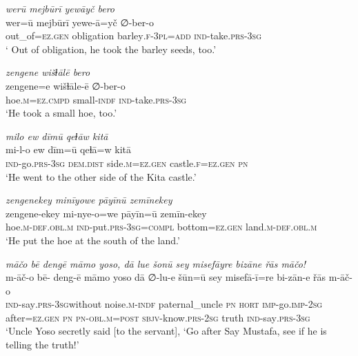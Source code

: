 \ea \label{ŽP.29}
\textit{werū mejbūrī yewāyč bero} \\ 
\gll wer=ū mejbūrī yewe-ā=yč ∅-ber-o \\ 
 out\_of\textsc{\textsc{=ez.gen}} obligation barley\textsc{.f}\textsc{-3pl}\textsc{=add} \textsc{ind-}take\textsc{.prs}\textsc{-3sg} \\ 
\glt ` Out of obligation, he took the barley seeds, too.'
\z 
 
\ea \label{ŽP.30}
\textit{zengene wišɫālē bero} \\ 
\gll zengene=e wišɫāle-ē ∅-ber-o \\ 
 hoe\textsc{.m}\textsc{=ez}\textsc{.cmpd} small\textsc{-indf} \textsc{ind-}take\textsc{.prs}\textsc{-3sg} \\ 
\glt `He took a small hoe, too.'
\z 
 
\ea \label{ŽP.31}
\textit{milo ew dīmū qeɫāw kitā} \\ 
\gll mi-l-o ew dīm=ū qeɫā=w kitā \\ 
 \textsc{ind-}go\textsc{.prs}\textsc{-3sg} \textsc{dem.dist} side\textsc{.m}\textsc{\textsc{=ez.gen}} castle\textsc{.f}\textsc{\textsc{=ez.gen}} \textsc{pn} \\ 
\glt `He went to the other side of the Kita castle.'
\z 
 
\ea \label{ŽP.34}
\textit{zengenekey minīyowe pāyīnū zemīnekey} \\ 
\gll zengene-ekey mi-nye-o=we pāyīn=ū zemīn-ekey \\ 
 hoe\textsc{.m}\textsc{-def}\textsc{.obl}\textsc{.m} \textsc{ind-}put\textsc{.prs}\textsc{-3sg}\textsc{=compl} bottom\textsc{\textsc{=ez.gen}} land\textsc{.m}\textsc{-def}\textsc{.obl}\textsc{.m} \\ 
\glt `He put the hoe at the south of the land.'
\z 
 
\ea \label{ŽP.43}
\textit{māčo bē dengē māmo yoso, dā lue šonū sey misefāyre bizāne řās māčo!} \\ 
\gll m-āč-o bē- deng-ē māmo yoso dā ∅-lu-e šūn=ū sey misefā-ī=re bi-zān-e řās m-āč-o \\ 
 \textsc{ind-}say\textsc{.prs}\textsc{-3sg}without noise\textsc{.m}\textsc{-indf} paternal\_uncle \textsc{pn} \textsc{hort} \textsc{imp-}go.\textsc{imp-}\textsc{2sg} after\textsc{\textsc{=ez.gen}} \textsc{pn} \textsc{pn}\textsc{-obl}\textsc{.m}\textsc{=\textsc{post}} \textsc{sbjv-}know\textsc{.prs}-\textsc{2sg} truth \textsc{ind-}say\textsc{.prs}\textsc{-3sg} \\ 
\glt `Uncle Yoso secretly said [to the servant], ‘Go after Say Mustafa, see if he is telling the truth!'
\z 
 
